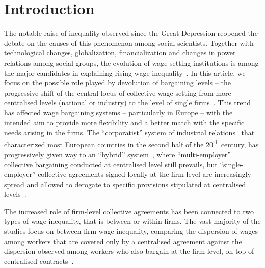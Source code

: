 \documentclass[12pt]{article}
\begin{document}
\cleardoublepage

\onehalfspacing


\section{Introduction}
\label{sec:intro}



The notable raise of inequality observed since the Great Depression
reopened the debate on the causes of this phenomenon among social
scientists. Together with technological changes, globalization,
financialization and changes in power relations among social groups,
the evolution of wage-setting institutions is among the major
candidates in explaining rising wage inequality~\citep{cobb2016}. In
this article, we focus on the possible role played by devolution of
bargaining levels -- the progressive shift of the central locus of
collective wage setting from more centralised levels (national or
industry) to the level of single firms~\citep{undy1978}. This trend
has affected wage bargaining systems -- particularly in Europe -- with
the intended aim to provide more flexibility and a better match with
the specific needs arising in the firms. The ``corporatist'' system of
industrial relations~\citep{wallerstein1997unions} that characterized
most European countries in the second half of the
20\textsuperscript{th} century, has progressively given way to an
``hybrid'' system~\citep{Braakmann}, where ``multi-employer''
collective bargaining conducted at centralised level still prevails,
but ``single-employer'' collective agreements signed locally at the
firm level are increasingly spread and allowed to derogate to specific
provisions stipulated at centralised levels~\citep{visser2013wage}.

The increased role of firm-level collective agreements has been
connected to two types of wage inequality, that is between or within
firms. The vast majority of the studies focus on between-firm wage
inequality, comparing the dispersion of wages among workers that are
covered only by a centralised agreement against the dispersion
observed among workers who also bargain at the firm-level, on top of
centralised
contracts~\citep{dellaringa.lucifora.1994,hibbs.locking.1996,palenzuela.jimeno.1996,hartog.leuven.ea.2002,rycx.2003,cardoso.portugal.2005,checchi.pagani.2005,plasman.rusinek.ea.2007,card.delarica.2006,dellaringa.pagani.2007,dahl.lemaire.ea.2013,daouli.demoussis.ea.2013}.
\end{document}
